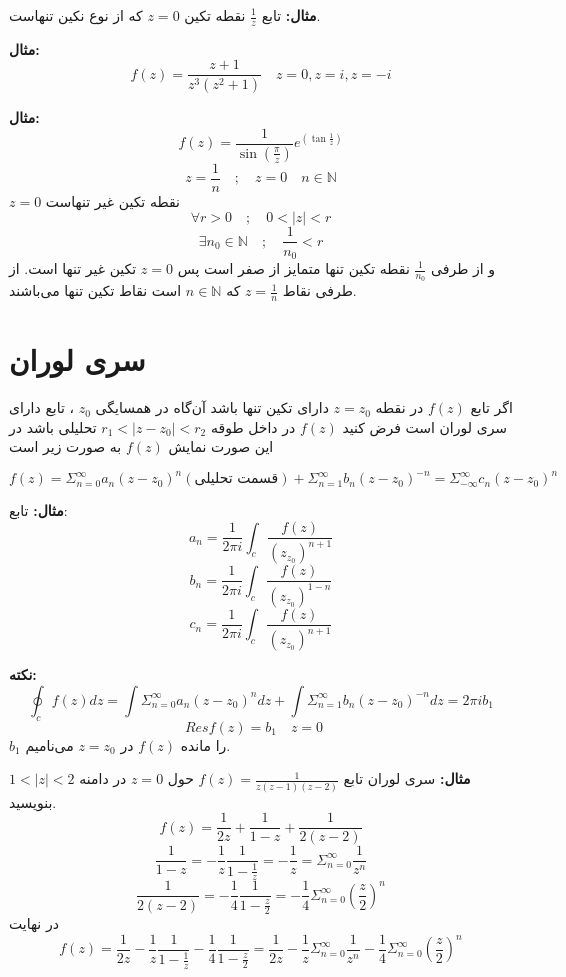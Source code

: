 \documentclass[12pt]{report}
\begin{document}
\textbf{مثال:}
تابع
 $\frac{1}{z}$
 نقطه تکین 
 $z = 0$
 که از نوع نکین تنهاست.

\textbf{مثال:}
$$f(z) = \frac{z + 1}{z^3(z^2 + 1)} \quad z =0 , z = i, z = -i$$


\textbf{مثال:}
$$f(z) = \frac{1}{\sin (\frac{\pi}{z})} e^{(\tan \frac{1}{z})}$$
$$z  = \frac{1}{n} \quad ; \quad z = 0 \quad n \in \mathbb{N}$$
$z = 0$
نقطه تکین غیر تنهاست
$$\forall r > 0 \quad ; \quad 0<|z|< r$$
$$\exists n_0 \in \mathbb{N} \quad ;\quad \frac{1}{n_0} < r$$
و از طرفی
$\frac{1}{n_0}$
نقطه تکین تنها متمایز از صفر است پس 
$z = 0$
تکین غیر تنها است.
از طرفی نقاط
$z = \frac{1}{n}$
که 
$n \in \mathbb{N}$
است نقاط تکین تنها می‌باشند.
\section{سری لوران}
اگر تابع
$f(z)$
در نقطه 
$z = z_0$
دارای تکین تنها باشد آن‌گاه در همسایگی 
$z_0$
،
تابع دارای سری لوران است فرض کنید
$f(z)$
در داخل طوقه 
$r_1<|z- z_0| < r_2$
تحلیلی باشد در این صورت نمایش 
$f(z)$
به صورت زیر است


$$f(z) = \Sigma_{n = 0}^{\infty} a_n(z- z_0)^n(\text{قسمت تحلیلی}) +\Sigma_{n = 1}^{\infty} b_n(z- z_0)^{-n} = \Sigma_{-\infty}^{\infty} c_n‌(z- z_0)^{n}$$
\newline

\textbf{مثال:}
تابع:
$$a_n = \frac{1}{2\pi i} \int_{c} \frac{f(z)}{(z_z_0)^{n+1}}$$
$$b_n = \frac{1}{2\pi i} \int_{c} \frac{f(z)}{(z_z_0)^{1 - n}}$$
$$c_n = \frac{1}{2\pi i} \int_{c} \frac{f(z)}{(z_z_0)^{n+1}}$$
\newline

\textbf{نکته:}
$$\oint_{c} f(z) dz = \int \Sigma_{n = 0}^{\infty} a_n(z- z_0)^n dz + \int \Sigma_{n = 1}^{\infty} b_n(z- z_0)^{-n} dz = 2\pi i b_1$$
$$Res f(z) = b_1 \quad z = 0 \quad$$
$b_1$
را مانده 
$f(z)$
در
$z = z_0$
می‌نامیم.
\newline

\textbf{مثال:}
سری لوران تابع 
$f(z) = \frac{1}{z(z - 1) (z- 2)}$
حول 
$z = 0$
در دامنه 
$1 < |z|< 2$
بنویسید.
$$f(z) = \frac{1}{2z} + \frac{1}{1 - z} + \frac{1}{2(z - 2)}$$
$$\frac{1}{1 - z} = - \frac{1}{z} \frac{1}{1 - \frac{1}{z}} = -\frac{1}{z} = \Sigma_{n = 0}^{\infty} 
\frac{1}{z^n}$$
$$\frac{1}{2(z - 2)} = -\frac{1}{4} \frac{1}{1 - \frac{z}{2}} = - \frac{1}{4} \Sigma_{n = 0}^{\infty} (\frac{z}{2})^n$$
در نهایت
$$f(z) = \frac{1}{2z}  -\frac{1}{z} \frac{1}{1 - \frac{1}{z}}-\frac{1}{4} \frac{1}{1 - \frac{z}{2}} = \frac{1}{2z} - \frac{1}{z} \Sigma_{n = 0}^{\infty} \frac{1}{z^n} - \frac{1}{4}\Sigma_{n = 0}^{\infty} (\frac{z}{2})^n$$
\newline
\end{document}
